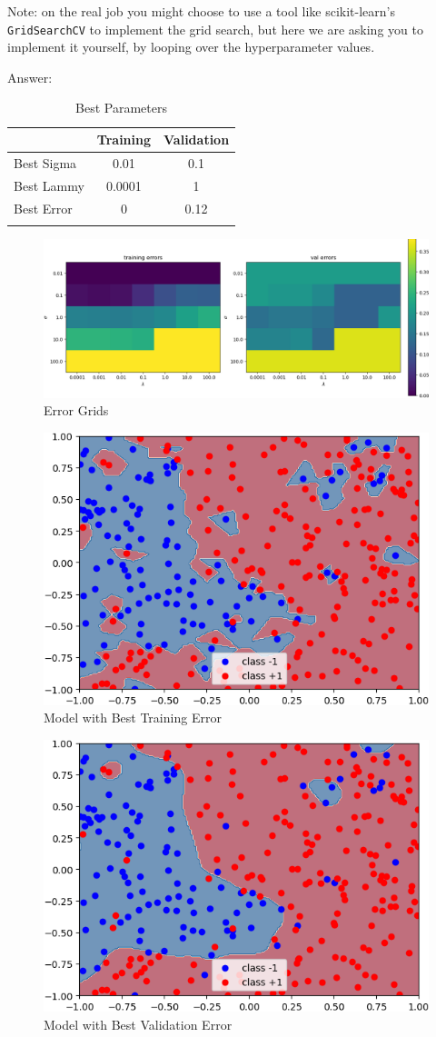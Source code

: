 \documentclass{article}
\newenvironment{answer}{\par\begingroup\color{gre}Answer: }{\endgroup}
\begin{document}
Note: on the real job you might choose to use a tool like scikit-learn's \texttt{GridSearchCV} to implement the grid search, but here we are asking you to implement it yourself, by looping over the hyperparameter values.
\begin{answer}
	\begin{table}[htbp!]
		\centering
		\begin{tabular}{lcc}
			\hline 
			& Training & Validation   \\
			\hline 
			Best Sigma & 0.01 & 0.1   \\
			Best Lammy & 0.0001 &  1\\
			Best Error & 0 & 0.12 \\
			\hline \\
		\end{tabular}
		\caption{Best Parameters}
	\end{table}

	\begin{figure}[htbp!]
		\centering
		\includegraphics[width =  \textwidth]{figs/logRegRBF_grids.png}
		\caption{Error Grids}
	\end{figure}

	\begin{figure}[htbp!]
		\centering
		\includegraphics[width = .5\textwidth]{figs/best_train.png}
		\caption{Model with Best Training Error}
	\end{figure}

	\begin{figure}[htbp!]
		\centering
		\includegraphics[width = .5\textwidth]{figs/best_val.png}
		\caption{Model with Best Validation Error}
	\end{figure}
	

\end{answer}
\end{document}

